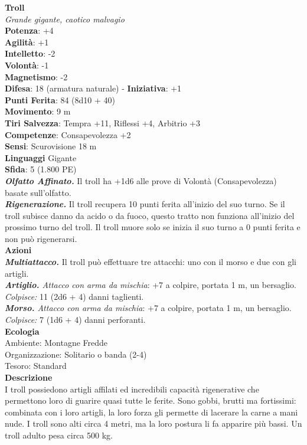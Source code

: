 \begin{multicols}{2}
\medskip\textbf{Troll}\\
\emph{Grande gigante, caotico malvagio}\\
\textbf{Potenza}: +4\\
\textbf{Agilità}: +1\\
\textbf{Intelletto}: -2\\
\textbf{Volontà}: -1\\
\textbf{Magnetismo}: -2\\
\textbf{Difesa}: 18 (armatura naturale) - \textbf{Iniziativa}: +1\\
\textbf{Punti Ferita}: 84 (8d10 + 40)\\
\textbf{Movimento}: 9 m\\
\textbf{Tiri Salvezza}: Tempra +11, Riflessi +4, Arbitrio +3\\
\textbf{Competenze}: Consapevolezza +2\\
\textbf{Sensi}: Scurovisione 18 m\\
\textbf{Linguaggi} Gigante\\
\textbf{Sfida}: 5 (1.800 PE)\smallskip\\
\emph{\textbf{Olfatto Affinato.}} Il troll ha +1d6 alle prove di Volontà (Consapevolezza) basate sull'olfatto.\\
\emph{\textbf{Rigenerazione.}} Il troll recupera 10 punti ferita all'inizio del suo turno. Se il troll subisce danno da acido o da fuoco, questo tratto non funziona all'inizio del prossimo turno del troll. Il troll muore solo se inizia il suo turno a 0 punti ferita e non può rigenerarsi.\\
\smallskip\textbf{Azioni}\\
\emph{\textbf{Multiattacco.}} Il troll può effettuare tre attacchi: uno con il morso e due con gli artigli.\\
\emph{\textbf{Artiglio.} Attacco con arma da mischia}: +7 a colpire, portata 1 m, un bersaglio.\\
\emph{Colpisce:} 11 (2d6 + 4) danni taglienti.\\
\emph{\textbf{Morso.} Attacco con arma da mischia}: +7 a colpire, portata 1 m, un bersaglio.\\
\emph{Colpisce:} 7 (1d6 + 4) danni perforanti.\\
\textbf{Ecologia}\\
Ambiente: Montagne Fredde\\
Organizzazione: Solitario o banda (2-4)\\
Tesoro: Standard\\
\textbf{Descrizione}\\
I troll possiedono artigli affilati ed incredibili capacità rigenerative che permettono loro di guarire quasi tutte le ferite. Sono gobbi, brutti ma fortissimi: combinata con i loro artigli, la loro forza gli permette di lacerare la carne a mani nude. I troll sono alti circa 4 metri, ma la loro postura li fa apparire più bassi. Un troll adulto pesa circa 500 kg.\\


\end{multicols}

